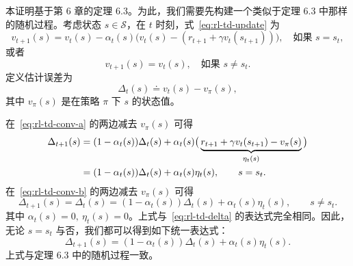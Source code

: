\begin{derivation}
\label{box:rl-td-convproof}
本证明基于第 6 章的定理 6.3。为此，我们需要先构建一个类似于定理 6.3 中那样的随机过程。考虑状态 $s \in \mathcal{S}$，在 $t$ 时刻，式~\eqref{eq:rl-td-update} 为
\begin{equation}
  v_{t+1}(s) = v_t(s) - \alpha_t(s) \Big( v_t(s) - (r_{t+1} + \gamma v_t(s_{t+1})) \Big), \quad \text{如果 } s = s_t,
  \label{eq:rl-td-conv-a}
\end{equation}
或者
\begin{equation}
  v_{t+1}(s) = v_t(s), \quad \text{如果 } s \neq s_t.
  \label{eq:rl-td-conv-b}
\end{equation}
定义估计误差为
\[
  \Delta_t(s) \doteq v_t(s) - v_{\pi}(s),
\]
其中 $v_{\pi}(s)$ 是在策略 $\pi$ 下 $s$ 的状态值。

在~\eqref{eq:rl-td-conv-a} 的两边减去 $v_{\pi}(s)$ 可得
\begin{align}
  \Delta_{t+1}(s) &= (1 - \alpha_t(s)) \Delta_t(s) + \alpha_t(s) \big( \underbrace{r_{t+1} + \gamma v_t(s_{t+1}) - v_{\pi}(s)}_{\eta_t(s)} \big) \notag \\
  &= (1 - \alpha_t(s)) \Delta_t(s) + \alpha_t(s) \eta_t(s), \qquad s = s_t.
  \label{eq:rl-td-delta}
\end{align}
在~\eqref{eq:rl-td-conv-b} 的两边减去 $v_{\pi}(s)$ 可得
\[
  \Delta_{t+1}(s) = \Delta_t(s) = (1 - \alpha_t(s)) \Delta_t(s) + \alpha_t(s) \eta_t(s), \qquad s \neq s_t.
\]
其中 $\alpha_t(s) = 0,\ \eta_t(s) = 0$。上式与~\eqref{eq:rl-td-delta} 的表达式完全相同。因此，无论 $s = s_t$ 与否，我们都可以得到如下统一表达式：
\[
  \Delta_{t+1}(s) = (1 - \alpha_t(s)) \Delta_t(s) + \alpha_t(s) \eta_t(s).
\]
上式与定理 6.3 中的随机过程一致。


\end{derivation}
